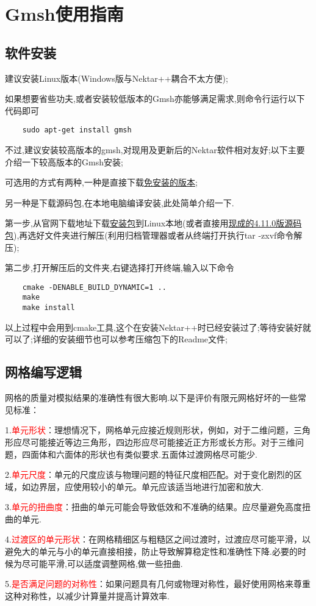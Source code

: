 \chapter{Gmsh使用指南}
\section{软件安装}
建议安装Linux版本(Windows版与Nektar++耦合不太方便);\par
如果想要省些功夫,或者安装较低版本的Gmsh亦能够满足需求,则命令行运行以下代码即可
\begin{lstlisting}
	sudo apt-get install gmsh
\end{lstlisting}

不过,建议安装较高版本的gmsh,对现用及更新后的Nektar软件相对友好;以下主要介绍一下较高版本的Gmsh安装;\par

可选用的方式有两种,一种是直接下载\href{http://www.gmsh.info/bin/}{免安装的版本};\par
另一种是下载源码包,在本地电脑编译安装,此处简单介绍一下.\par
第一步,从官网下载地址下载\href{http://www.gmsh.info/src/}{安装包}到Linux本地(或者直接用\href{https://pan.baidu.com/s/1CmeE9yY8ChXeBrb2mMIzXA?pwd=xxwz}{现成的4.11.0版源码包}),再选好文件夹进行解压(利用归档管理器或者从终端打开执行tar -zxvf命令解压);\par
第二步,打开解压后的文件夹,右键选择打开终端,输入以下命令
\begin{lstlisting}
	cmake -DENABLE_BUILD_DYNAMIC=1 .. 
	make 
	make install
\end{lstlisting}
\par
以上过程中会用到cmake工具,这个在安装Nektar++时已经安装过了;等待安装好就可以了;详细的安装细节也可以参考压缩包下的Readme文件;


\section{网格编写逻辑}
网格的质量对模拟结果的准确性有很大影响.以下是评价有限元网格好坏的一些常见标准：\par
1.\textcolor{red}{单元形状}：理想情况下，网格单元应接近规则形状，例如，对于二维问题，三角形应尽可能接近等边三角形，四边形应尽可能接近正方形或长方形。对于三维问题，四面体和六面体的形状也有类似要求.五面体过渡网格尽可能少.\par
2.\textcolor{red}{单元尺度}：单元的尺度应该与物理问题的特征尺度相匹配。对于变化剧烈的区域，如边界层，应使用较小的单元。单元应该适当地进行加密和放大.\par
3.\textcolor{red}{单元的扭曲度}：扭曲的单元可能会导致低效和不准确的结果。应尽量避免高度扭曲的单元.\par
4.\textcolor{red}{过渡区的单元形状}：在网格精细区与粗糙区之间过渡时，过渡应尽可能平滑，以避免大的单元与小的单元直接相接，防止导致解算稳定性和准确性下降.必要的时候为尽可能平滑,可以适度调整网格,做一些扭曲.\par
5.\textcolor{red}{是否满足问题的对称性}：如果问题具有几何或物理对称性，最好使用网格来尊重这种对称性，以减少计算量并提高计算效率.\par

